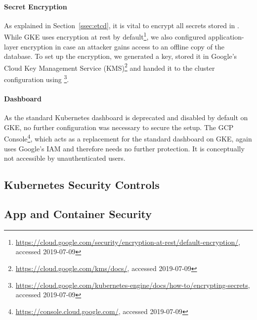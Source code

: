 \paragraph{Secret Encryption}

As explained in Section~\ref{ssec:etcd}, it is vital to encrypt all secrets stored in . While \ac{GKE} uses encryption at rest by default\footnote{\url{https://cloud.google.com/security/encryption-at-rest/default-encryption/}, accessed 2019-07-09}, we also configured application-layer encryption in case an attacker gains access to an offline copy of the  database. To set up the encryption, we generated a key, stored it in Google's Cloud Key Management Service (KMS)\footnote{\url{https://cloud.google.com/kms/docs/}, accessed 2019-07-09} and handed it to the cluster configuration using \footnote{\url{https://cloud.google.com/kubernetes-engine/docs/how-to/encrypting-secrets}, accessed 2019-07-09}.  

\paragraph{Dashboard}

As the standard Kubernetes dashboard is deprecated and disabled by default on GKE, no further configuration was necessary to secure the setup. The \ac{GCP} Console\footnote{\url{https://console.cloud.google.com/}, accessed 2019-07-09}, which acts as a replacement for the standard dashboard on \ac{GKE}, again uses Google's \ac{IAM} and therefore needs no further protection. It is conceptually not accessible by unauthenticated users. 

\subsection{Kubernetes Security Controls}

\subsection{App and Container Security}

